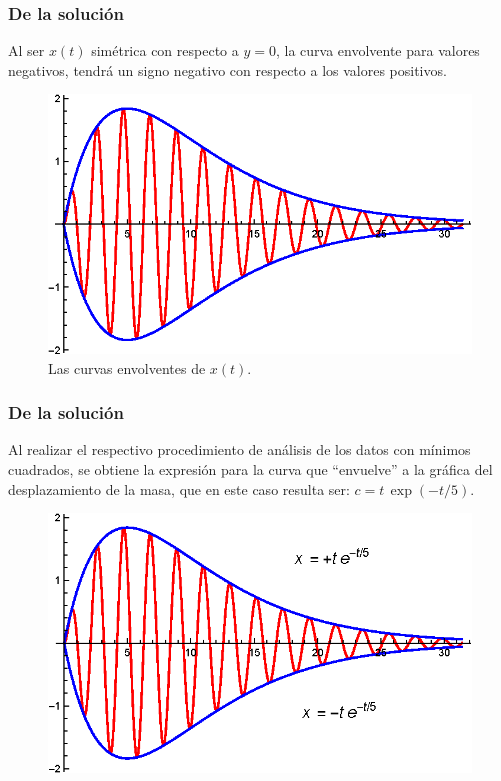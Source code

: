 \begin{frame}
\frametitle{De la solución}
Al ser $x(t)$ simétrica con respecto a $y = 0$, la curva envolvente para valores negativos, tendrá un signo negativo con respecto a los valores positivos.
\end{frame}
\begin{frame}[plain]
\begin{figure}[H]
    \centering
    \includegraphics[scale=0.55]{Imagenes/Ejemplo_Resonancia_04.eps}
    \caption{Las curvas envolventes de $x(t)$.}
\end{figure}
\end{frame}
\begin{frame}
\frametitle{De la solución}
Al realizar el respectivo procedimiento de análisis de los datos con mínimos cuadrados, se obtiene la expresión para la curva que \enquote{envuelve} a la gráfica del desplazamiento de la masa, que en este caso resulta ser: $c = t \, \exp(-t/5)$.
\end{frame}
\begin{frame}[plain]
\begin{figure}[H]
    \centering
    \includegraphics[scale=0.55]{Imagenes/Ejemplo_Resonancia_05.eps}
\end{figure}
\end{frame}

